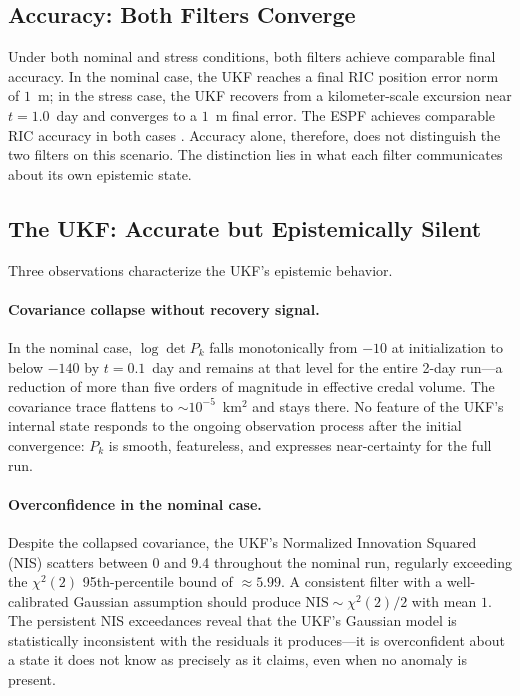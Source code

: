 \documentclass[12pt]{article}
\begin{document}
\subsection{Accuracy: Both Filters Converge}

Under both nominal and stress conditions, both filters achieve
comparable final accuracy.
In the nominal case, the UKF reaches a final RIC position error norm of
$1$~m; in the stress case, the UKF recovers from a kilometer-scale
excursion near $t=1.0$~day and converges to a $1$~m final error.
The ESPF achieves comparable RIC accuracy in both cases
\cite{jah2026optimality}.
Accuracy alone, therefore, does not distinguish the two filters on this scenario.
The distinction lies in what each filter communicates about its own epistemic state.

\subsection{The UKF: Accurate but Epistemically Silent}

Three observations characterize the UKF's epistemic behavior.

\paragraph{Covariance collapse without recovery signal.}
In the nominal case, $\log\det P_k$ falls monotonically from $-10$
at initialization to below $-140$ by $t=0.1$~day and remains at that
level for the entire 2-day run---a reduction of more than five orders of
magnitude in effective credal volume.
The covariance trace flattens to $\sim\!10^{-5}$~km$^2$ and stays there.
No feature of the UKF's internal state responds to the ongoing observation
process after the initial convergence: $P_k$ is smooth, featureless, and
expresses near-certainty for the full run.

\paragraph{Overconfidence in the nominal case.}
Despite the collapsed covariance, the UKF's Normalized Innovation Squared
(NIS) scatters between 0 and 9.4 throughout the nominal run, regularly
exceeding the $\chi^2(2)$ 95th-percentile bound of $\approx 5.99$.
A consistent filter with a well-calibrated Gaussian assumption should
produce $\mathrm{NIS}\sim\chi^2(2)/2$ with mean $1$.
The persistent NIS exceedances reveal that the UKF's Gaussian model is
statistically inconsistent with the residuals it produces---it is
overconfident about a state it does not know as precisely as it claims,
even when no anomaly is present.
\end{document}

